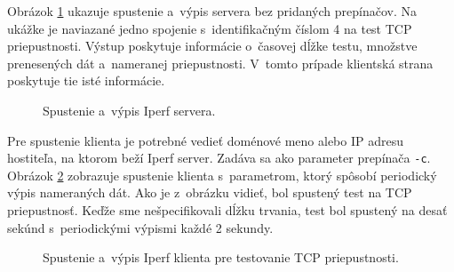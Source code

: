         Obrázok \ref{iperf_s} ukazuje spustenie a~výpis servera bez pridaných
        prepínačov. Na ukážke je naviazané jedno spojenie
        s~identifikačným číslom 4 na test TCP priepustnosti. 
        Výstup poskytuje informácie o~časovej dĺžke testu, množstve 
        prenesených dát a~nameranej priepustnosti. V~tomto 
        prípade klientská strana poskytuje tie isté informácie.

        \begin{figure}[H]
            \begin{center}
                \caption{Spustenie a~výpis Iperf servera.}
                \label{iperf_s}
            \end{center}
       \end{figure}

       Pre spustenie klienta je potrebné vedieť doménové meno alebo IP adresu
       hostiteľa, na ktorom beží Iperf server. Zadáva sa ako parameter prepínača 
       \texttt{-c}. 
       Obrázok \ref{iperf_c_i} zobrazuje spustenie klienta
       s~parametrom, ktorý spôsobí periodický výpis nameraných dát. Ako je
       z~obrázku vidieť, bol spustený test na TCP priepustnosť. Keďže sme
       nešpecifikovali dĺžku trvania, test bol spustený na desať sekúnd
       s~periodickými výpismi každé 2 sekundy.

        \begin{figure}[H]
            \begin{center}
                \caption{Spustenie a~výpis Iperf klienta pre testovanie TCP
                    priepustnosti.}
                \label{iperf_c_i}
            \end{center}
       \end{figure}

